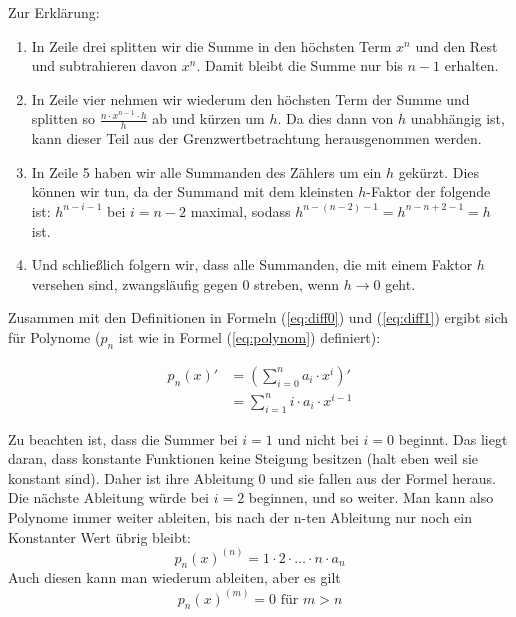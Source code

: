 \noindent Zur Erklärung:

\begin{enumerate}
\item In Zeile drei splitten wir die Summe in den höchsten Term $x^n$ und den Rest und subtrahieren davon $x^n$. Damit bleibt die Summe nur bis $n-1$ erhalten.
\item In Zeile vier nehmen wir wiederum den höchsten Term der Summe und splitten so $\frac{n\cdot x^{n-1}\cdot h}{h}$ ab und kürzen um $h$. Da dies dann von $h$ unabhängig ist, kann dieser Teil aus der Grenzwertbetrachtung herausgenommen werden.
\item In Zeile 5 haben wir alle Summanden des Zählers um ein $h$ gekürzt. Dies können wir tun, da der Summand mit dem kleinsten $h$-Faktor der folgende ist: $h^{n-i-1}$ bei $i=n-2$ maximal, sodass $h^{n-(n-2)-1}=h^{n-n+2-1}=h$ ist.
\item Und schließlich folgern wir, dass alle Summanden, die mit einem Faktor $h$ versehen sind, zwangsläufig gegen 0 streben, wenn $h\rightarrow 0$ geht. 
\end{enumerate}

Zusammen mit den Definitionen in Formeln (\ref{eq:diff0}) und (\ref{eq:diff1}) ergibt sich für Polynome ($p_n$ ist wie in Formel (\ref{eq:polynom}) definiert):

\begin{equation}
\begin{split}
p_n(x)' &= \left( \sum_{i=0}^{n} a_i \cdot x^i \right)' \\
&= \sum_{i=1}^{n} i\cdot a_i \cdot x^{i-1}
\end{split}
\end{equation}

Zu beachten ist, dass die Summer bei $i=1$ und nicht bei $i=0$ beginnt. Das liegt daran, dass konstante Funktionen keine Steigung besitzen (halt eben weil sie konstant sind). Daher ist ihre Ableitung 0 und sie fallen aus der Formel heraus. Die nächste Ableitung würde bei $i=2$ beginnen, und so weiter. Man kann also Polynome immer weiter ableiten, bis nach der n-ten Ableitung nur noch ein Konstanter Wert übrig bleibt:
\begin{equation*}
p_n(x)^{(n)} = 1\cdot 2 \cdot \dots \cdot n \cdot a_n
\end{equation*}
Auch diesen kann man wiederum ableiten, aber es gilt 
\begin{equation*}
p_n(x)^{(m)} = 0 \text{ für } m>n
\end{equation*}



